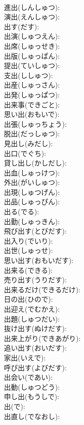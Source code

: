 \documentclass[8pt]{extreport}
\begin{document}
\begin{CJK}{UTF8}{min}
\\	進出(しんしゅつ): 
\\	演出(えんしゅつ): 
\\	出す(だす): 
\\	出演(しゅつえん): 
\\	出席(しゅっせき): 
\\	出版(しゅっぱん): 
\\	提出(ていしゅつ): 
\\	支出(ししゅつ): 
\\	出産(しゅっさん): 
\\	出発(しゅっぱつ): 
\\	出来事(できごと): 
\\	思い出(おもいで): 
\\	出張(しゅっちょう): 
\\	脱出(だっしゅつ): 
\\	見出し(みだし): 
\\	出口(でぐち): 
\\	貸し出し(かしだし): 
\\	出血(しゅっけつ): 
\\	外出(がいしゅつ): 
\\	出現(しゅつげん): 
\\	出品(しゅっぴん): 
\\	出る(でる): 
\\	出勤(しゅっきん): 
\\	飛び出す(とびだす): 
\\	出入り(でいり): 
\\	出世(しゅっせ): 
\\	思い出す(おもいだす): 
\\	出来る(できる): 
\\	売り出す(うりだす): 
\\	出来るだけ(できるだけ): 
\\	日の出(ひので): 
\\	出迎え(でむかえ): 
\\	出題(しゅつだい): 
\\	抜け出す(ぬけだす): 
\\	出来上がり(できあがり): 
\\	追い出す(おいだす): 
\\	家出(いえで): 
\\	呼び出す(よびだす): 
\\	出会い(であい): 
\\	出動(しゅつどう): 
\\	申し出(もうしで): 
\\	出(で): 
\\	出直し(でなおし): 

\end{CJK}
\end{document}
